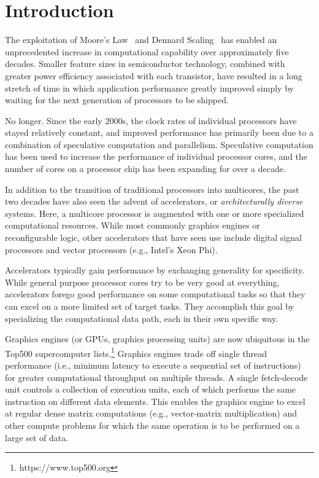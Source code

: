 \section{Introduction}
\label{sec:intro}

The exploitation of Moore's Law~\cite{Moore65,Mack11}
and Dennard Scaling~\cite{Dennard74,Bohr07}
has enabled an unprecedented increase in computational capability over 
approximately five decades. Smaller feature sizes in semiconductor
technology, combined with greater power efficiency associated with each
transistor, have resulted in a long stretch of time in which application
performance greatly improved simply by waiting for the next generation
of processors to be shipped.

No longer. Since the early 2000s, the clock rates of individual processors
have stayed relatively constant, and improved performance has primarily
been due to a combination of speculative computation and parallelism.
Speculative computation has been used to increase the performance of
individual processor cores, and the number of cores on a processor chip
has been expanding for over a decade.

In addition to the transition of traditional processors into multicores,
the past two decades have also seen the advent of accelerators, or
\emph{architecturally diverse} systems.
Here, a multicore processor is augmented
with one or more specialized computational resources.  While most
commonly graphics engines or reconfigurable logic, other accelerators
that have seen use include digital signal processors
and vector processors (e.g., Intel's Xeon Phi).

Accelerators typically gain performance by exchanging generality for
specificity. While general purpose processor cores try to be very good
at everything, accelerators forego good performance on some computational
tasks so that they can excel on a more limited set of target tasks.
They accomplish this goal by specializing the computational data path,
each in their own specific way.

Graphics engines (or GPUs, graphics processing units) are now ubiquitous
in the Top500 supercomputer lists.\footnote{https://www.top500.org}
Graphics engines trade off single thread performance (i.e., minimum latency
to execute a sequential set of instructions) for greater computational
throughput on multiple threads.  A single fetch-decode unit controls a
collection of execution units, each of which performs the same instruction
on different data elements.  This enables the graphics engine to excel
at regular dense matrix computations (e.g., vector-matrix multiplication)
and other compute problems for which the same operation is to be performed
on a large set of data.

